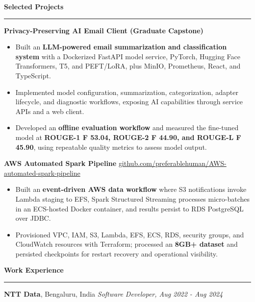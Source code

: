 \documentclass[11pt,letterpaper]{article}
\newcommand{\ressection}[1]{\Needspace{6\baselineskip}\vspace{8pt}\par\textbf{#1}\par\vspace{2pt}\hrule\vspace{5pt}}
\begin{document}
\ressection{Selected Projects}
\textbf{Privacy-Preserving AI Email Client (Graduate Capstone)}
\begin{itemize}
  \item Built an \textbf{LLM-powered email summarization and classification system} with a Dockerized FastAPI model service, PyTorch, Hugging Face Transformers, T5, and PEFT/LoRA, plus MinIO, Prometheus, React, and TypeScript.
  \item Implemented model configuration, summarization, categorization, adapter lifecycle, and diagnostic workflows, exposing AI capabilities through service APIs and a web client.
  \item Developed an \textbf{offline evaluation workflow} and measured the fine-tuned model at \textbf{ROUGE-1 F 53.04, ROUGE-2 F 44.90, and ROUGE-L F 45.90}, using repeatable quality metrics to assess model output.
\end{itemize}
\vspace{2pt}
\textbf{AWS Automated Spark Pipeline} \hfill \href{https://github.com/preferablehuman/AWS-automated-spark-pipeline}{github.com/preferablehuman/AWS-automated-spark-pipeline}
\begin{itemize}
  \item Built an \textbf{event-driven AWS data workflow} where S3 notifications invoke Lambda staging to EFS, Spark Structured Streaming processes micro-batches in an ECS-hosted Docker container, and results persist to RDS PostgreSQL over JDBC.
  \item Provisioned VPC, IAM, S3, Lambda, EFS, ECS, RDS, security groups, and CloudWatch resources with Terraform; processed an \textbf{8GB+ dataset} and persisted checkpoints for restart recovery and operational visibility.
\end{itemize}
\ressection{Work Experience}
\textbf{NTT Data}, Bengaluru, India \hfill \textit{Software Developer, Aug 2022 - Aug 2024}
\end{document}
